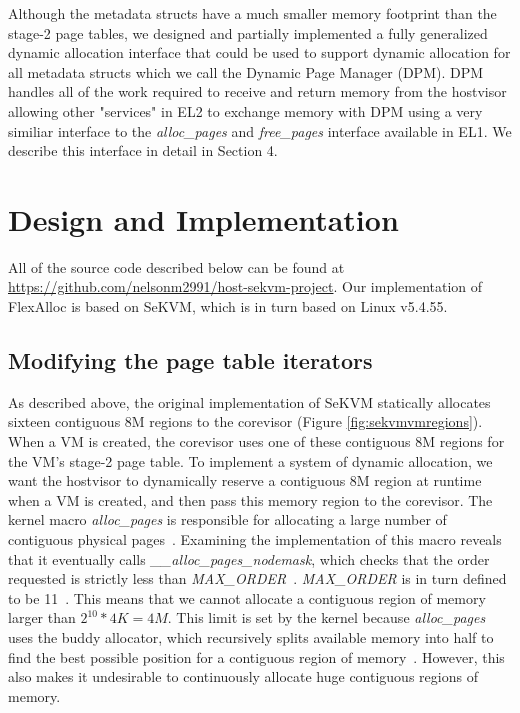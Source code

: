 Although the metadata structs have a much smaller memory footprint than the stage-2 page tables,
we designed and partially implemented a fully generalized dynamic allocation interface that
could be used to support dynamic allocation for all metadata structs which we call the
Dynamic Page Manager (DPM). DPM handles all of the work required to receive and return
memory from the hostvisor allowing other "services" in EL2 to exchange memory with DPM using
a very similiar interface to the \textit{alloc\_pages} and \textit{free\_pages} interface available in EL1. We describe
this interface in detail in Section 4.

\section{Design and Implementation}

All of the source code described below can be found at \url{https://github.com/nelsonm2991/host-sekvm-project}.
Our implementation of FlexAlloc is based on SeKVM, which is in turn based on Linux v5.4.55.

\subsection{Modifying the page table iterators}

As described above, the original implementation of SeKVM statically
allocates sixteen contiguous 8M regions to the corevisor (Figure \ref{fig:sekvmvmregions}). When a VM is created,
the corevisor uses one of these contiguous 8M regions for the VM's stage-2
page table. To implement a system of dynamic allocation, we want the hostvisor
to dynamically reserve a contiguous 8M region at runtime when a VM is created, and then
pass this memory region to the corevisor. The kernel macro \textit{alloc\_pages}
is responsible for allocating a large number of contiguous physical pages~\cite{kerneldocs}.
Examining the implementation of this macro reveals that it eventually
calls \textit{\_\_alloc\_pages\_nodemask}, which checks that the order requested
is strictly less than \textit{MAX\_ORDER}~\cite{page_alloc.c}. \textit{MAX\_ORDER}
is in turn defined to be 11~\cite{mmzone.h}. This means that we cannot allocate
a contiguous region of memory larger than $2^{10} * 4K = 4M$. This
limit is set by the kernel because \textit{alloc\_pages} uses the buddy allocator,
which recursively splits available memory into half to find the best possible position for
a contiguous region of memory~\cite{kerneldocs}. However, this also makes it
undesirable to continuously allocate huge contiguous regions of memory.

